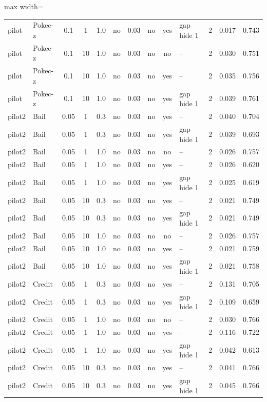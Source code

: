 \begin{table}[p]
\begin{adjustbox}{max width=\textwidth}
\begin{tabular}{llccccccclccc}
pilot & Pokec-z & 0.1 & 1 & 1.0 & no & 0.03 & no & yes & gap hide 1 & 2 & 0.017 & 0.743 \\
pilot & Pokec-z & 0.1 & 10 & 1.0 & no & 0.03 & no & no & -- & 2 & 0.030 & 0.751 \\
pilot & Pokec-z & 0.1 & 10 & 1.0 & no & 0.03 & no & yes & -- & 2 & 0.035 & 0.756 \\
pilot & Pokec-z & 0.1 & 10 & 1.0 & no & 0.03 & no & yes & gap hide 1 & 2 & 0.039 & 0.761 \\
pilot2 & Bail & 0.05 & 1 & 0.3 & no & 0.03 & no & yes & -- & 2 & 0.040 & 0.704 \\
pilot2 & Bail & 0.05 & 1 & 0.3 & no & 0.03 & no & yes & gap hide 1 & 2 & 0.039 & 0.693 \\
pilot2 & Bail & 0.05 & 1 & 1.0 & no & 0.03 & no & no & -- & 2 & 0.026 & 0.757 \\
pilot2 & Bail & 0.05 & 1 & 1.0 & no & 0.03 & no & yes & -- & 2 & 0.026 & 0.620 \\
pilot2 & Bail & 0.05 & 1 & 1.0 & no & 0.03 & no & yes & gap hide 1 & 2 & 0.025 & 0.619 \\
pilot2 & Bail & 0.05 & 10 & 0.3 & no & 0.03 & no & yes & -- & 2 & 0.021 & 0.749 \\
pilot2 & Bail & 0.05 & 10 & 0.3 & no & 0.03 & no & yes & gap hide 1 & 2 & 0.021 & 0.749 \\
pilot2 & Bail & 0.05 & 10 & 1.0 & no & 0.03 & no & no & -- & 2 & 0.026 & 0.757 \\
pilot2 & Bail & 0.05 & 10 & 1.0 & no & 0.03 & no & yes & -- & 2 & 0.021 & 0.759 \\
pilot2 & Bail & 0.05 & 10 & 1.0 & no & 0.03 & no & yes & gap hide 1 & 2 & 0.021 & 0.758 \\
pilot2 & Credit & 0.05 & 1 & 0.3 & no & 0.03 & no & yes & -- & 2 & 0.131 & 0.705 \\
pilot2 & Credit & 0.05 & 1 & 0.3 & no & 0.03 & no & yes & gap hide 1 & 2 & 0.109 & 0.659 \\
pilot2 & Credit & 0.05 & 1 & 1.0 & no & 0.03 & no & no & -- & 2 & 0.030 & 0.766 \\
pilot2 & Credit & 0.05 & 1 & 1.0 & no & 0.03 & no & yes & -- & 2 & 0.116 & 0.722 \\
pilot2 & Credit & 0.05 & 1 & 1.0 & no & 0.03 & no & yes & gap hide 1 & 2 & 0.042 & 0.613 \\
pilot2 & Credit & 0.05 & 10 & 0.3 & no & 0.03 & no & yes & -- & 2 & 0.041 & 0.766 \\
pilot2 & Credit & 0.05 & 10 & 0.3 & no & 0.03 & no & yes & gap hide 1 & 2 & 0.045 & 0.766 \\

\end{tabular}
\end{adjustbox}
\end{table}
